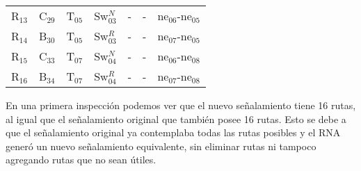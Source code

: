 \begin{table}[!h]
{{\begin{tabular}{ c c c c c c c }
                    R$_{13}$  & C$_{29}$ & T$_{05}$ & Sw$_{03}^{N}$ & - & - & ne$_{06}$-ne$_{05}$\\
                    R$_{14}$  & B$_{30}$ & T$_{05}$ & Sw$_{03}^{R}$ & - & - & ne$_{07}$-ne$_{05}$\\
                    R$_{15}$  & C$_{33}$ & T$_{07}$ & Sw$_{04}^{N}$ & - & - & ne$_{06}$-ne$_{08}$\\
                    R$_{16}$  & B$_{34}$ & T$_{07}$ & Sw$_{04}^{R}$ & - & - & ne$_{07}$-ne$_{08}$\\
                \hline
            \end{tabular}
        }
     }
    \end{table}
    
    En una primera inspección podemos ver que el nuevo señalamiento tiene 16 rutas, al igual que el señalamiento original que también posee 16 rutas. Esto se debe a que el señalamiento original ya contemplaba todas las rutas posibles y el RNA generó un nuevo señalamiento equivalente, sin eliminar rutas ni tampoco agregando rutas que no sean útiles.